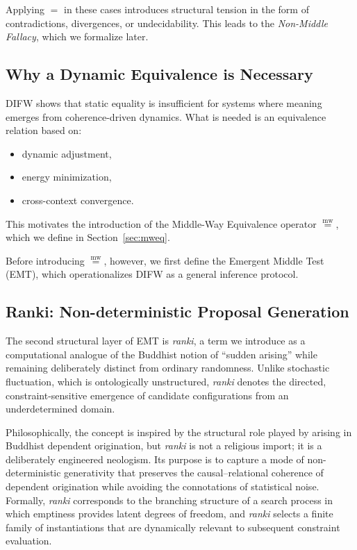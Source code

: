 \documentclass[11pt]{article}
\newcommand{\mweq}{\mathrel{\overset{\mathrm{mw}}{=}}}
\theoremstyle{definition}
\theoremstyle{remark}
\begin{document}
Applying $=$ in these cases introduces structural tension in the
form of contradictions, divergences, or undecidability. This leads
to the \emph{Non-Middle Fallacy}, which we formalize later.

\subsection{Why a Dynamic Equivalence is Necessary}

DIFW shows that static equality is insufficient for systems where
meaning emerges from coherence-driven dynamics. What is needed is
an equivalence relation based on:

\begin{itemize}
    \item dynamic adjustment,
    \item energy minimization,
    \item cross-context convergence.
\end{itemize}

This motivates the introduction of the Middle-Way Equivalence
operator $\mweq$, which we define in Section~\ref{sec:mweq}.

Before introducing $\mweq$, however, we first define the
Emergent Middle Test (EMT), which operationalizes DIFW as a
general inference protocol.


\subsection{Ranki: Non-deterministic Proposal Generation}

The second structural layer of EMT is \emph{ranki}, a term we introduce
as a computational analogue of the Buddhist notion of “sudden arising”
while remaining deliberately distinct from ordinary randomness.
Unlike stochastic fluctuation, which is ontologically unstructured,
\emph{ranki} denotes the directed, constraint-sensitive emergence of
candidate configurations from an underdetermined domain.

Philosophically, the concept is inspired by the structural role played
by arising in Buddhist dependent origination, but \emph{ranki} is not a
religious import; it is a deliberately engineered neologism. Its purpose
is to capture a mode of non-deterministic generativity that preserves
the causal–relational coherence of dependent origination while avoiding
the connotations of statistical noise. Formally, \emph{ranki}
corresponds to the branching structure of a search process in which
emptiness provides latent degrees of freedom, and \emph{ranki} selects a
finite family of instantiations that are dynamically relevant to
subsequent constraint evaluation.
\end{document}
